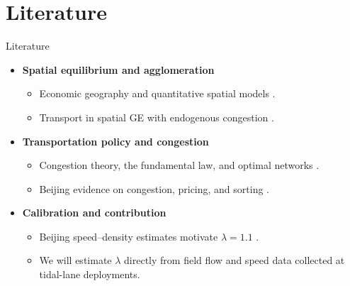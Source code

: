\documentclass[11pt,aspectratio=169]{beamer}
\newcommand{\good}[1]{\textcolor{blue!70!black}{#1}}
\begin{document}
\section{Literature}
\begin{frame}{Literature}
\begin{itemize}\small
  \item \textbf{Spatial equilibrium and agglomeration}
  \begin{itemize}\footnotesize
    \item Economic geography and quantitative spatial models \citep{krugman1991,eaton2002,allen2014,ahlfeldt2015}.
    \item Transport in spatial GE with endogenous congestion \citep{allenarkolakis2022}.
  \end{itemize}
  \item \textbf{Transportation policy and congestion}
  \begin{itemize}\footnotesize
    \item Congestion theory, the fundamental law, and optimal networks \citep{vickrey1969,duranton2011,fajgelbaum2020}.
    \item Beijing evidence on congestion, pricing, and sorting \citep{barwick2024,yang2020}.
  \end{itemize}
  \item \textbf{Calibration and contribution}
  \begin{itemize}\footnotesize
    \item Beijing speed--density estimates motivate \good{$\lambda=1.1$} \citep{barwick2024}.
    \item We will estimate $\lambda$ directly from field flow and speed data collected at tidal-lane deployments.
  \end{itemize}
\end{itemize}
\end{frame}

\end{document}
